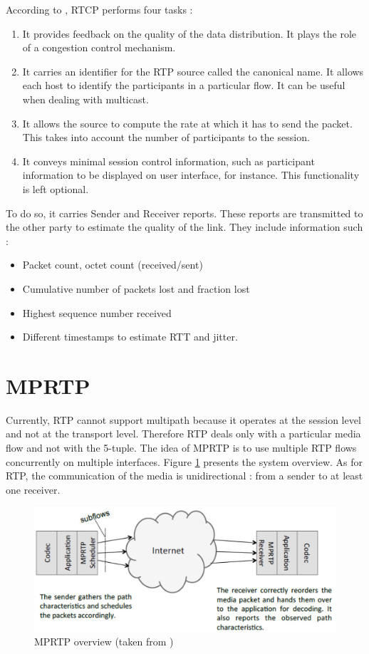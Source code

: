 According to \cite{javvin2005network}, RTCP performs four tasks : 

\begin{enumerate}
\item It provides feedback on the quality of the data distribution. It plays the role of a congestion control mechanism.
\item It carries an identifier for the RTP source called the canonical name. It allows each host to identify the participants in a particular flow. It can be useful when dealing with multicast.
\item It allows the source to compute the rate at which it has to send the packet. This takes into account the number of participants to the session.
\item It conveys minimal session control information, such as participant information to be displayed on user interface, for instance. This functionality is left optional.
\end{enumerate}

To do so, it carries Sender and Receiver reports. These reports are transmitted to the other party to estimate the quality of the link. They include information such :

\begin{itemize}
\item Packet count, octet count (received/sent)
\item Cumulative number of packets lost and fraction lost
\item Highest sequence number received
\item Different timestamps to estimate RTT and jitter.
\end{itemize}


\section{MPRTP}

Currently, RTP cannot support multipath because it operates at the session level and not at the transport level. Therefore RTP deals only with a particular media flow and not with the 5-tuple. The idea of MPRTP is to use multiple RTP flows concurrently on multiple interfaces. Figure \ref{fig:mprtp-concept} presents the system overview. As for RTP, the communication of the media is unidirectional : from a sender to at least one receiver. 


\begin{figure}
\centering
\includegraphics[width=0.9\linewidth]{images/mprtp}
\caption{MPRTP overview (taken from \cite{singh2013mprtp})}
\label{fig:mprtp-concept}
\end{figure}

